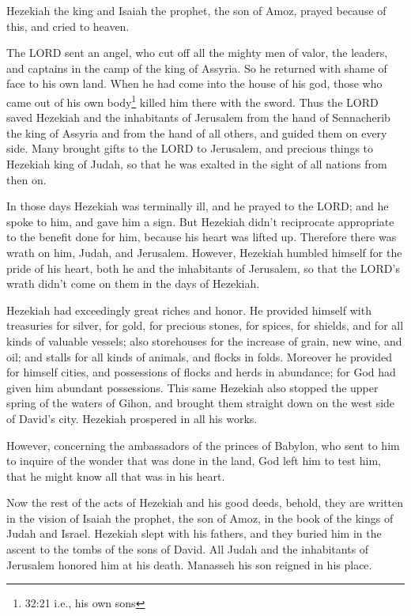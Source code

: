 \myverse{}Hezekiah the king and Isaiah the prophet, the son of Amoz, prayed
because of this, and cried to heaven.

\myverse{}The LORD sent an angel, who cut off all the mighty men of valor,
the leaders, and captains in the camp of the king of Assyria. So he returned with shame of face to his
own land. When he had come into the house of his god, those who came out of his own body\footnote{32:21 i.e., his own sons} killed him there with the sword.
\myverse{}Thus the LORD saved Hezekiah and the inhabitants of Jerusalem from the hand
of Sennacherib the king of Assyria and from the hand of all others, and guided them on every side.
\myverse{}Many brought gifts to the LORD to Jerusalem, and precious things to Hezekiah
king of Judah, so that he was exalted in the sight of all nations from then on.

\myverse{}In those days Hezekiah was terminally ill, and he prayed to
the LORD; and he spoke to him, and gave him a sign.
\myverse{}But Hezekiah didn’t reciprocate appropriate to the benefit done for him,
because his heart was lifted up. Therefore there was wrath on him, Judah, and Jerusalem.
\myverse{}However, Hezekiah humbled himself for the pride of his heart, both he and
the inhabitants of Jerusalem, so that the LORD’s wrath didn’t come on them in the days of Hezekiah.

\myverse{}Hezekiah had exceedingly great riches and honor. He provided
himself with treasuries for silver, for gold, for precious stones, for spices, for shields, and for all
kinds of valuable vessels;
\myverse{}also storehouses for the increase of grain, new wine, and oil; and stalls
for all kinds of animals, and flocks in folds.
\myverse{}Moreover he provided for himself cities, and possessions of flocks and herds
in abundance; for God had given him abundant possessions.
\myverse{}This same Hezekiah also stopped the upper spring of the waters of Gihon,
and brought them straight down on the west side of David’s city. Hezekiah prospered in all his works.

\myverse{}However, concerning the ambassadors of the princes of Babylon,
who sent to him to inquire of the wonder that was done in the land, God left him to test him, that he
might know all that was in his heart.

\myverse{}Now the rest of the acts of Hezekiah and his good deeds, behold,
they are written in the vision of Isaiah the prophet, the son of Amoz, in the book of the kings of Judah
and Israel.
\myverse{}Hezekiah slept with his fathers, and they buried him in the ascent to the
tombs of the sons of David. All Judah and the inhabitants of Jerusalem honored him at his death. Manasseh
his son reigned in his place.


